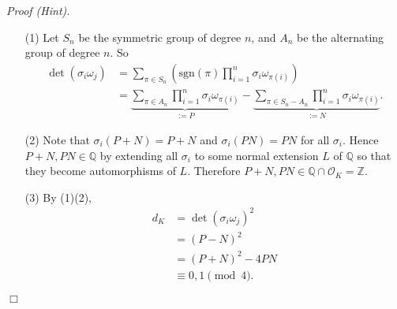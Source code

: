 \documentclass{article}
\begin{document}
\emph{Proof (Hint).}
\begin{enumerate}
\item[(1)]
  Let $S_n$ be the symmetric group of degree $n$, and
  $A_n$ be the alternating group of degree $n$.
  So
  \begin{align*}
    \det(\sigma_i \omega_j)
    &= \sum_{\pi \in S_n}
      \left( \mathrm{sgn}(\pi) \prod_{i=1}^{n} \sigma_i \omega_{\pi(i)} \right) \\
    &= \underbrace{\sum_{\pi \in A_n} \prod_{i=1}^{n} \sigma_i \omega_{\pi(i)}}_{:= P}
      - \underbrace{\sum_{\pi \in S_n - A_n} \prod_{i=1}^{n} \sigma_i \omega_{\pi(i)}}_{:= N}.
  \end{align*}

\item[(2)]
  Note that $\sigma_i(P+N) = P+N$ and $\sigma_i(PN) = PN$ for all $\sigma_i$.
  Hence $P+N, PN \in \mathbb{Q}$
  by extending all $\sigma_i$ to some normal extension $L$ of $\mathbb{Q}$ so that
  they become automorphisms of $L$.
  Therefore $P+N, PN \in \mathbb{Q} \cap \mathcal{O}_K = \mathbb{Z}$.

\item[(3)]
  By (1)(2),
  \begin{align*}
    d_K
    &= \det(\sigma_i \omega_j)^2 \\
    &= (P-N)^2 \\
    &= (P+N)^2 - 4PN \\
    &\equiv 0, 1 \pmod 4.
  \end{align*}
\end{enumerate}
$\Box$ \\\\






\end{document}
